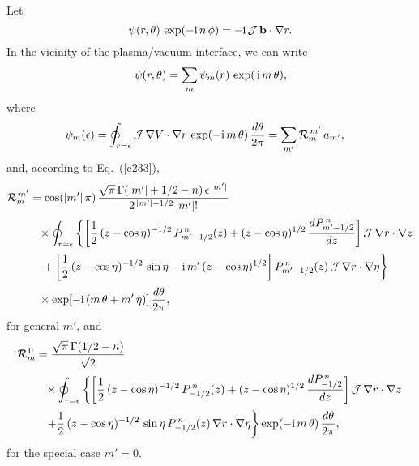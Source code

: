 \documentclass[12pt,prb,aps]{revtex4-1}
\begin{document}
Let
\begin{equation}\label{ebnm}
\psi(r,\theta)\,\exp(-{\rm i}\,n\,\phi) = -{\rm i}\,{\cal J}\,{\bf b}\cdot\nabla r.
\end{equation}
In the vicinity of the plasma/vacuum interface, we can write
\begin{equation}\label{ebnm1}
\psi(r,\theta) = \sum_m \psi_m(r)\,\exp(\,{\rm i}\,m\,\theta),
\end{equation}
where
\begin{align}\label{e352}
\psi_m(\epsilon)&= \oint_{r=\epsilon}{\cal J}\,\nabla V\cdot \nabla r\,\exp(-{\rm i}\,m\,\theta)\,\frac{d\theta}{2\pi}= \sum_{m'}{\cal R}_m^{\,m'}\,a_{m'},
\end{align}
and,  according to Eq.~(\ref{e233}), 
\begin{align}\label{e354}
{\cal R}_m^{\,m'} &=\cos(|m'|\,\pi)\,
\frac{\sqrt{\pi}\,\Gamma(|m'|+1/2-n)\,\epsilon^{\,|m'|}}{2^{\,|m'|-1/2}\,|m'|!}
\nonumber\\[0.5ex]&\phantom{=}\times \oint_{r=\epsilon}
\left\{\left[\frac{1}{2}\,(z-\cos\eta)^{-1/2}\,P_{m'-1/2}^{\,n}(z)+(z-\cos\eta)^{1/2}\,\frac{dP_{m'-1/2}^{\,n}}{dz}\right]{\cal J}\,\nabla r\cdot \nabla z
\right.\nonumber\\[0.5ex]&
\left.\phantom{=}+\left[\frac{1}{2}\,(z-\cos\eta)^{-1/2}\,\sin\eta-{\rm i}\,m'\,(z-\cos\eta)^{1/2}\right]P_{m'-1/2}^{\,n}(z)\,{\cal J}\,\nabla r\cdot \nabla \eta
\right\}\nonumber\\[0.5ex] &
\phantom{=}\times\exp[-{\rm i}\,(m\,\theta+m'\,\eta)]\,\frac{d\theta}{2\pi},
\end{align}
for general $m'$, and 
\begin{align}\label{e356}
{\cal R}_m^{\,0} &=
\frac{\sqrt{\pi}\,\Gamma(1/2-n)}{\sqrt{2}}
\nonumber\\[0.5ex]&\phantom{=}\times \oint_{r=\epsilon}
\left\{\left[\frac{1}{2}\,(z-\cos\eta)^{-1/2}\,P_{-1/2}^{\,n}(z)+(z-\cos\eta)^{1/2}\,\frac{dP_{-1/2}^{\,n}}{dz}\right]{\cal J}\,\nabla r \cdot\nabla z
\right.\nonumber\\[0.5ex]&
\phantom{=}\left.+\frac{1}{2}\,(z-\cos\eta)^{-1/2}\,\sin\eta\,P_{-1/2}^{\,n}(z)\,\nabla r \cdot \nabla \eta
\right\}\exp(-{\rm i}\,m\,\theta)\,\frac{d\theta}{2\pi},
\end{align}
for the special case $m'=0$.
\end{document}
